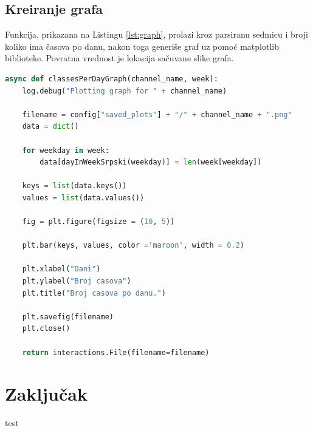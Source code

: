 \documentclass[a4paper,11pt]{article}
\begin{document}
\subsection{Kreiranje grafa}
Funkcija, prikazana na Listingu \ref{lst:graph}, prolazi kroz parsiranu sedmicu i broji koliko ima časova po danu, nakon toga generiše graf uz pomoć matplotlib\cite{matplotlib} biblioteke. Povratna vrednost je lokacija sačuvane slike grafa.
\begin{lstlisting}[language=Python, caption=Kreiranje grafa, label=lst:graph]
async def classesPerDayGraph(channel_name, week):
    log.debug("Plotting graph for " + channel_name)

    filename = config["saved_plots"] + "/" + channel_name + ".png"
    data = dict()

    for weekday in week:
        data[dayInWeekSrpski(weekday)] = len(week[weekday])

    keys = list(data.keys())
    values = list(data.values())

    fig = plt.figure(figsize = (10, 5))

    plt.bar(keys, values, color ='maroon', width = 0.2)

    plt.xlabel("Dani")
    plt.ylabel("Broj casova")
    plt.title("Broj casova po danu.")

    plt.savefig(filename)
    plt.close()

    return interactions.File(filename=filename)
\end{lstlisting}
\newpage
\section{Zaključak}
test
\newpage

\pagestyle{plain}
\renewcommand\refname{Literatura}


\end{document}
